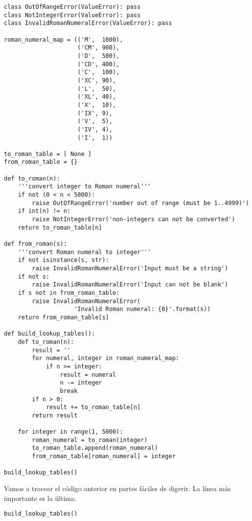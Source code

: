 \noindent\begin{minipage}{\textwidth}
\begin{lstlisting}[mathescape=True]
class OutOfRangeError(ValueError): pass
class NotIntegerError(ValueError): pass
class InvalidRomanNumeralError(ValueError): pass

roman_numeral_map = (('M',  1000),
                     ('CM', 900),
                     ('D',  500),
                     ('CD', 400),
                     ('C',  100),
                     ('XC', 90),
                     ('L',  50),
                     ('XL', 40),
                     ('X',  10),
                     ('IX', 9),
                     ('V',  5),
                     ('IV', 4),
                     ('I',  1))

to_roman_table = [ None ]
from_roman_table = {}

def to_roman(n):
    '''convert integer to Roman numeral'''
    if not (0 < n < 5000):
        raise OutOfRangeError('number out of range (must be 1..4999)')
    if int(n) != n:
        raise NotIntegerError('non-integers can not be converted')
    return to_roman_table[n]

def from_roman(s):
    '''convert Roman numeral to integer'''
    if not isinstance(s, str):
        raise InvalidRomanNumeralError('Input must be a string')
    if not s:
        raise InvalidRomanNumeralError('Input can not be blank')
    if s not in from_roman_table:
        raise InvalidRomanNumeralError(
                    'Invalid Roman numeral: {0}'.format(s))
    return from_roman_table[s]

def build_lookup_tables():
    def to_roman(n):
        result = ''
        for numeral, integer in roman_numeral_map:
            if n >= integer:
                result = numeral
                n -= integer
                break
        if n > 0:
            result += to_roman_table[n]
        return result

    for integer in range(1, 5000):
        roman_numeral = to_roman(integer)
        to_roman_table.append(roman_numeral)
        from_roman_table[roman_numeral] = integer

build_lookup_tables()
\end{lstlisting}
\end{minipage}

Vamos a trocear el código anterior en partes fáciles de digerir. La línea más importante es la última.

\noindent\begin{minipage}{\textwidth}
\begin{lstlisting}[mathescape=True]
build_lookup_tables()
\end{lstlisting}
\end{minipage}

